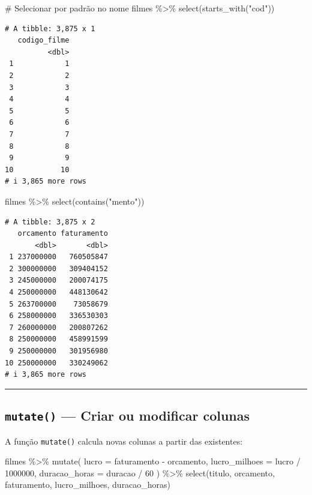 \documentclass[
  letterpaper,
]{scrbook}
\newenvironment{Shaded}{\begin{snugshade}}{\end{snugshade}}
\newcommand{\AttributeTok}[1]{\textcolor[rgb]{0.40,0.45,0.13}{#1}}
\newcommand{\CommentTok}[1]{\textcolor[rgb]{0.37,0.37,0.37}{#1}}
\newcommand{\DecValTok}[1]{\textcolor[rgb]{0.68,0.00,0.00}{#1}}
\newcommand{\FunctionTok}[1]{\textcolor[rgb]{0.28,0.35,0.67}{#1}}
\newcommand{\NormalTok}[1]{\textcolor[rgb]{0.00,0.23,0.31}{#1}}
\newcommand{\SpecialCharTok}[1]{\textcolor[rgb]{0.37,0.37,0.37}{#1}}
\newcommand{\StringTok}[1]{\textcolor[rgb]{0.13,0.47,0.30}{#1}}
\begin{document}
\begin{Shaded}
\begin{Highlighting}[]
\CommentTok{\# Selecionar por padrão no nome}
\NormalTok{filmes }\SpecialCharTok{\%\textgreater{}\%} 
  \FunctionTok{select}\NormalTok{(}\FunctionTok{starts\_with}\NormalTok{(}\StringTok{"cod"}\NormalTok{))}
\end{Highlighting}
\end{Shaded}

\begin{verbatim}
# A tibble: 3,875 x 1
   codigo_filme
          <dbl>
 1            1
 2            2
 3            3
 4            4
 5            5
 6            6
 7            7
 8            8
 9            9
10           10
# i 3,865 more rows
\end{verbatim}

\begin{Shaded}
\begin{Highlighting}[]
\NormalTok{filmes }\SpecialCharTok{\%\textgreater{}\%} 
  \FunctionTok{select}\NormalTok{(}\FunctionTok{contains}\NormalTok{(}\StringTok{"mento"}\NormalTok{))}
\end{Highlighting}
\end{Shaded}

\begin{verbatim}
# A tibble: 3,875 x 2
   orcamento faturamento
       <dbl>       <dbl>
 1 237000000   760505847
 2 300000000   309404152
 3 245000000   200074175
 4 250000000   448130642
 5 263700000    73058679
 6 258000000   336530303
 7 260000000   200807262
 8 250000000   458991599
 9 250000000   301956980
10 250000000   330249062
# i 3,865 more rows
\end{verbatim}

\begin{center}\rule{0.5\linewidth}{0.5pt}\end{center}

\subsection{\texorpdfstring{\texttt{mutate()} --- Criar ou modificar
colunas}{mutate() --- Criar ou modificar colunas}}\label{mutate-criar-ou-modificar-colunas}

A função \texttt{mutate()} calcula novas colunas a partir das
existentes:

\begin{Shaded}
\begin{Highlighting}[]
\NormalTok{filmes }\SpecialCharTok{\%\textgreater{}\%} 
  \FunctionTok{mutate}\NormalTok{(}
    \AttributeTok{lucro =}\NormalTok{ faturamento }\SpecialCharTok{{-}}\NormalTok{ orcamento,}
    \AttributeTok{lucro\_milhoes =}\NormalTok{ lucro }\SpecialCharTok{/} \DecValTok{1000000}\NormalTok{,}
    \AttributeTok{duracao\_horas =}\NormalTok{ duracao }\SpecialCharTok{/} \DecValTok{60}
\NormalTok{  ) }\SpecialCharTok{\%\textgreater{}\%} 
  \FunctionTok{select}\NormalTok{(titulo, orcamento, faturamento, lucro\_milhoes, duracao\_horas)}
\end{Highlighting}
\end{Shaded}
\end{document}
